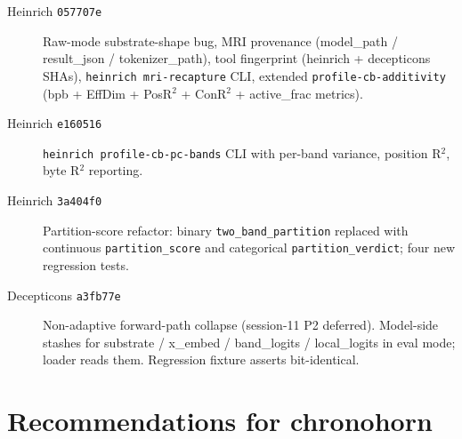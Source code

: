\documentclass[11pt,openany]{book}
\begin{document}
\begin{description}
  \item[Heinrich \texttt{057707e}] Raw-mode substrate-shape bug, MRI provenance
  (model\_path / result\_json / tokenizer\_path), tool fingerprint
  (heinrich + decepticons SHAs), \texttt{heinrich mri-recapture} CLI,
  extended \texttt{profile-cb-additivity} (bpb + EffDim + PosR$^2$ + ConR$^2$
  + active\_frac metrics).
  \item[Heinrich \texttt{e160516}] \texttt{heinrich profile-cb-pc-bands} CLI
  with per-band variance, position R$^2$, byte R$^2$ reporting.
  \item[Heinrich \texttt{3a404f0}] Partition-score refactor: binary
  \texttt{two\_band\_partition} replaced with continuous
  \texttt{partition\_score} and categorical \texttt{partition\_verdict};
  four new regression tests.
  \item[Decepticons \texttt{a3fb77e}] Non-adaptive forward-path collapse
  (session-11 P2 deferred). Model-side stashes for substrate /
  x\_embed / band\_logits / local\_logits in eval mode; loader reads them.
  Regression fixture asserts bit-identical.
\end{description}

\chapter{Recommendations for chronohorn}
\end{document}
